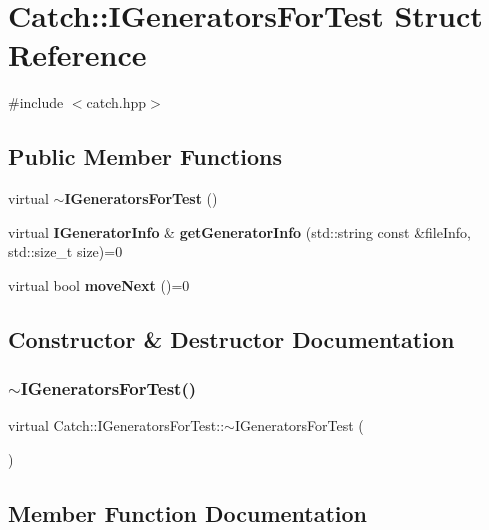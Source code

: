 \section{Catch\+:\+:I\+Generators\+For\+Test Struct Reference}
\label{struct_catch_1_1_i_generators_for_test}


{\ttfamily \#include $<$catch.\+hpp$>$}

\subsection*{Public Member Functions}
\begin{DoxyCompactItemize}
\item 
virtual \textbf{ $\sim$\+I\+Generators\+For\+Test} ()
\item 
virtual \textbf{ I\+Generator\+Info} \& \textbf{ get\+Generator\+Info} (std\+::string const \&file\+Info, std\+::size\+\_\+t size)=0
\item 
virtual bool \textbf{ move\+Next} ()=0
\end{DoxyCompactItemize}


\subsection{Constructor \& Destructor Documentation}
\mbox{\label{struct_catch_1_1_i_generators_for_test_a05725e76ee92e498f73479a61f3e3c7c}} 
\subsubsection{$\sim$\+I\+Generators\+For\+Test()}
{\footnotesize\ttfamily virtual Catch\+::\+I\+Generators\+For\+Test\+::$\sim$\+I\+Generators\+For\+Test (\begin{DoxyParamCaption}{ }\end{DoxyParamCaption})\hspace{0.3cm}{\ttfamily [virtual]}}



\subsection{Member Function Documentation}
\mbox{\label{struct_catch_1_1_i_generators_for_test_a180d84e858840188e4c3788e47eefdb0}} 
